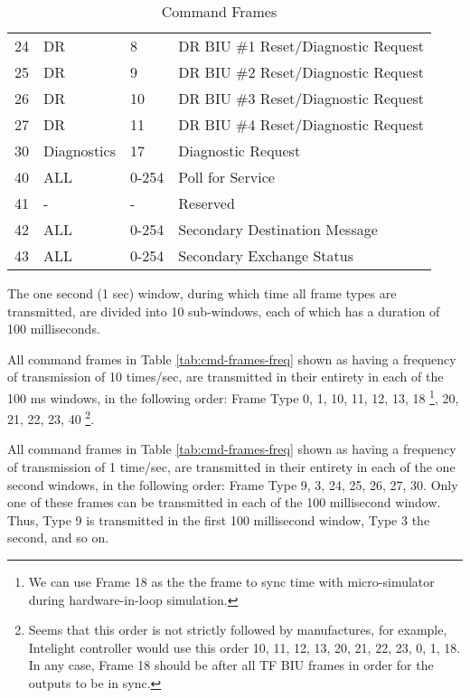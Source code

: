 \documentclass[]{article}
\begin{document}
\begin{table}[ht]
\begin{tabular}{llll}
		24            & DR              & 8                & DR BIU \#1 Reset/Diagnostic Request        \\
		25            & DR              & 9                & DR BIU \#2 Reset/Diagnostic Request        \\
		26            & DR              & 10               & DR BIU \#3 Reset/Diagnostic Request        \\
		27            & DR              & 11               & DR BIU \#4 Reset/Diagnostic Request        \\
		30            & Diagnostics     & 17               & Diagnostic Request                         \\
		40            & ALL             & 0-254            & Poll for Service                           \\
		41            & -               & -                & Reserved                                   \\
		42            & ALL             & 0-254            & Secondary Destination Message              \\
		43            & ALL             & 0-254            & Secondary Exchange Status                  \\ \hline
	\end{tabular}
	\caption{Command Frames}
	\label{tab:cmd-frames}
\end{table}

The one second (1 sec) window, during which time all frame types are transmitted, are divided into 10 sub-windows, each of which has a duration of 100 milliseconds.  

All command frames in Table \ref{tab:cmd-frames-freq} shown as having a frequency of transmission of 10 times/sec, are transmitted in their entirety in each of the 100 ms windows, in the following order: Frame Type 0, 1, 10, 11, 12, 13, 18 \footnote{We can use Frame 18 as the the frame to sync time with micro-simulator during hardware-in-loop simulation.}, 20, 21, 22, 23, 40 \footnote{Seems that this order is not strictly followed by manufactures, for example, Intelight controller would use this order 10, 11, 12, 13, 20, 21, 22, 23, 0, 1, 18.  In any case, Frame 18 should be after all TF BIU frames in order for the outputs to be in sync.}. 

All command frames in Table \ref{tab:cmd-frames-freq} shown as having a frequency of transmission of 1 time/sec, are transmitted in their entirety in each of the one second windows, in the following order: Frame Type 9, 3, 24, 25, 26, 27, 30. Only one of these frames can be transmitted in each of the 100 millisecond window. Thus, Type 9 is transmitted in the first 100 millisecond window, Type 3 the second, and so on.
\end{document}
